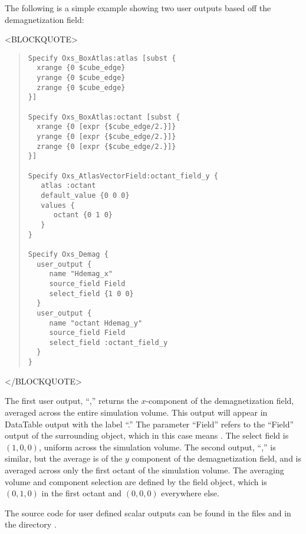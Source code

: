 The following is a simple example showing two user outputs based
off the demagnetization field:
\begin{rawhtml}<BLOCKQUOTE>\end{rawhtml}
\begin{quote}
\begin{verbatim}
Specify Oxs_BoxAtlas:atlas [subst {
  xrange {0 $cube_edge}
  yrange {0 $cube_edge}
  zrange {0 $cube_edge}
}]

Specify Oxs_BoxAtlas:octant [subst {
  xrange {0 [expr {$cube_edge/2.}]}
  yrange {0 [expr {$cube_edge/2.}]}
  zrange {0 [expr {$cube_edge/2.}]}
}]

Specify Oxs_AtlasVectorField:octant_field_y {
   atlas :octant
   default_value {0 0 0}
   values {
      octant {0 1 0}
   }
}

Specify Oxs_Demag {
  user_output {
     name "Hdemag_x"
     source_field Field
     select_field {1 0 0}
  }
  user_output {
     name "octant Hdemag_y"
     source_field Field
     select_field :octant_field_y
  }
}\end{verbatim}
\end{quote}
\begin{rawhtml}</BLOCKQUOTE>\end{rawhtml}
The first user output, ``,'' returns the
$x$-component of the demagnetization field, averaged across the entire
simulation volume.  This output will appear in DataTable output with the
label ``.''  The  parameter
``Field'' refers to the ``Field'' output of the surrounding
 object, which in this case means .
The select field is $(1,0,0)$, uniform across the simulation volume.
The second output, ``,'' is similar, but the
average is of the $y$ component of the demagnetization field, and is
averaged across only the first octant of the simulation volume.  The
averaging volume and component selection are defined by the
 field object, which is $(0,1,0)$ in the first
octant and $(0,0,0)$ everywhere else.

The source code for user defined scalar outputs can be found in the
files  and  in the directory .

